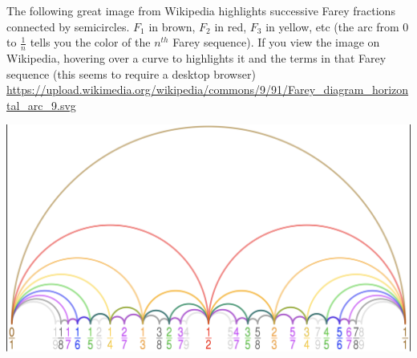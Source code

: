 \documentclass{ximera}
\begin{document}
The following great image from Wikipedia highlights successive Farey fractions connected by semicircles. $F_1$ in brown, $F_2$ in red, $F_3$ in yellow, etc (the arc from $0$ to $\frac{1}{n}$ tells you the color of the $n^{th}$ Farey sequence). If you view the image on Wikipedia, hovering over a curve to highlights it and the terms in that Farey sequence (this seems to require a desktop browser) \url{https://upload.wikimedia.org/wikipedia/commons/9/91/Farey_diagram_horizontal_arc_9.svg}
\begin{image}
 \includegraphics{farey}
\end{image}
\end{document}
